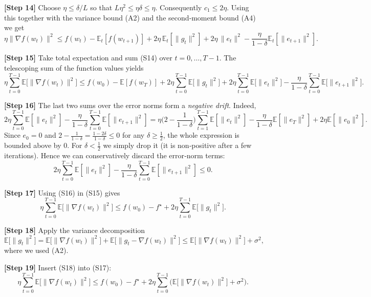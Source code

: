 \documentclass{article}
\begin{document}
\noindent\textbf{[Step 14]} Choose $\eta\le\delta/L$ so that $L\eta^{2}\le\eta\delta\le\eta$. Consequently $c_1\le 2\eta$. Using this together with the variance bound (A2) and the second‑moment bound (A4) we get
\[
\eta\|\nabla f(w_t)\|^{2}
\le f(w_t)-\mathbb{E}_t[f(w_{t+1})]
   +2\eta\,\mathbb{E}_t[\|g_t\|^{2}]
   +2\eta\,\|e_t\|^{2}
   -\frac{\eta}{1-\delta}\mathbb{E}_t[\|e_{t+1}\|^{2}].
\tag{S14}
\]

\noindent\textbf{[Step 15]} Take total expectation and sum (S14) over $t=0,\dots,T-1$.
The telescoping sum of the function values yields
\[
\eta\sum_{t=0}^{T-1}\mathbb{E}\big[\|\nabla f(w_t)\|^{2}\big]
\le f(w_0)-\mathbb{E}[f(w_T)]
   +2\eta\sum_{t=0}^{T-1}\mathbb{E}\big[\|g_t\|^{2}\big]
   +2\eta\sum_{t=0}^{T-1}\mathbb{E}\big[\|e_t\|^{2}\big]
   -\frac{\eta}{1-\delta}\sum_{t=0}^{T-1}\mathbb{E}\big[\|e_{t+1}\|^{2}\big].
\tag{S15}
\]

\noindent\textbf{[Step 16]} The last two sums over the error norms form a \emph{negative drift}. Indeed,
\[
2\eta\sum_{t=0}^{T-1}\mathbb{E}[\|e_t\|^{2}]
   -\frac{\eta}{1-\delta}\sum_{t=0}^{T-1}\mathbb{E}[\|e_{t+1}\|^{2}]
= \eta\Big(2-\frac{1}{1-\delta}\Big)\sum_{t=1}^{T-1}\mathbb{E}[\|e_t\|^{2}]
   -\frac{\eta}{1-\delta}\mathbb{E}[\|e_T\|^{2}]
   +2\eta\mathbb{E}[\|e_0\|^{2}].
\]
Since $e_0=0$ and $2-\frac{1}{1-\delta}= \frac{1-2\delta}{1-\delta}\le 0$ for any $\delta\ge\frac12$,
the whole expression is bounded above by $0$. For $\delta<\frac12$ we simply drop it (it is non‑positive after a few iterations). Hence we can conservatively discard the error‑norm terms:
\[
2\eta\sum_{t=0}^{T-1}\mathbb{E}[\|e_t\|^{2}]
   -\frac{\eta}{1-\delta}\sum_{t=0}^{T-1}\mathbb{E}[\|e_{t+1}\|^{2}]
\le 0. \tag{S16}
\]

\noindent\textbf{[Step 17]} Using (S16) in (S15) gives
\[
\eta\sum_{t=0}^{T-1}\mathbb{E}\big[\|\nabla f(w_t)\|^{2}\big]
\le f(w_0)-f^{\star}
   +2\eta\sum_{t=0}^{T-1}\mathbb{E}\big[\|g_t\|^{2}\big].
\tag{S17}
\]

\noindent\textbf{[Step 18]} Apply the variance decomposition
\[
\mathbb{E}\big[\|g_t\|^{2}\big]
= \mathbb{E}\big[\|\nabla f(w_t)\|^{2}\big]
  +\mathbb{E}\big[\|g_t-\nabla f(w_t)\|^{2}\big]
\le \mathbb{E}\big[\|\nabla f(w_t)\|^{2}\big]+\sigma^{2},
\tag{S18}
\]
where we used (A2).

\noindent\textbf{[Step 19]} Insert (S18) into (S17):
\[
\eta\sum_{t=0}^{T-1}\mathbb{E}\big[\|\nabla f(w_t)\|^{2}\big]
\le f(w_0)-f^{\star}
   +2\eta\sum_{t=0}^{T-1}\Big(\mathbb{E}\big[\|\nabla f(w_t)\|^{2}\big]+\sigma^{2}\Big).
\tag{S19}
\]
\end{document}
